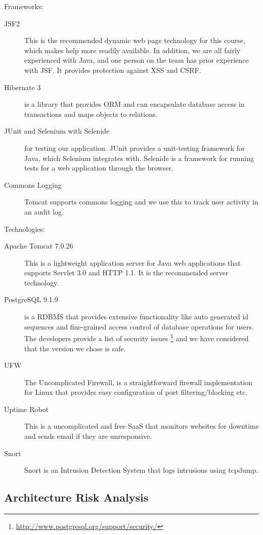 \documentclass[a4paper]{article}
\begin{document}
Frameworks:
\begin{description}
\item[JSF2] This is the recommended dynamic web page technology for this course, which makes help more readily available. In addition, we are all fairly experienced with Java, and one person on the team has prior experience with JSF. It provides protection against XSS and CSRF. 
\item[Hibernate 3] is a library that provides ORM and can encapsulate database access in transactions and maps objects to relations.
\item[JUnit and Selenium with Selenide] for testing our application. JUnit provides a unit-testing framework for Java, which Selenium integrates with. Selenide is a framework for running tests for a web application through the browser.
\item[Commons Logging]
Tomcat supports commons logging and we use this to track user activity in an audit log.
\end{description}
Technologies:
\begin{description}
\item[Apache Tomcat 7.0.26] This is a lightweight application server for Java web applications that supports Servlet 3.0 and HTTP 1.1. It is the recommended server technology. 
\item[PostgreSQL 9.1.9] is a RDBMS that provides extensive functionality like auto generated id sequences and fine-grained access control of database operations for users. The developers provide a list of security issues \footnote{\href{http://www.postgresql.org/support/security/}{http://www.postgresql.org/support/security/}} and we have considered that the version we chose is safe.
\item[UFW] The Uncomplicated Firewall, is a straightforward firewall implementation for Linux that provides easy configuration of port filtering/blocking etc.
\item[Uptime Robot] This is a uncomplicated and free SaaS that monitors websites for downtime and sends email if they are unresponsive.
\item[Snort] Snort is an Intrusion Detection System that logs intrusions using tcpdump.
\end{description}

\subsection{Architecture Risk Analysis}
\end{document}
